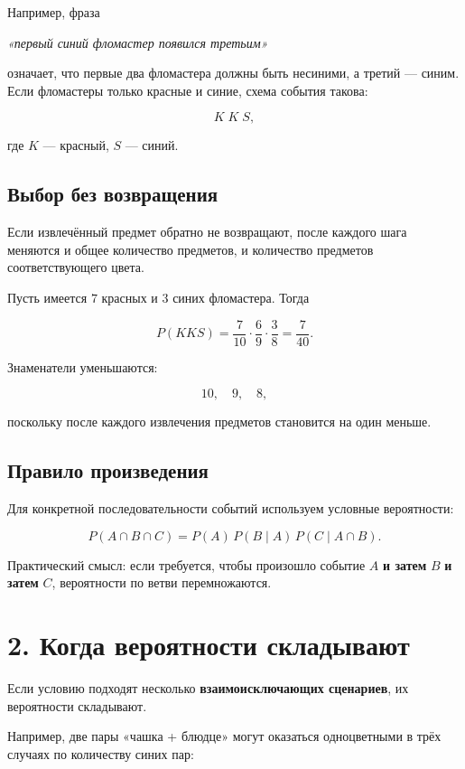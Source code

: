 \documentclass[a4paper,12pt]{article}
\newcommand{\key}[1]{\textcolor{darkaccent}{\textbf{#1}}}
\begin{document}
Например, фраза

\begin{center}
\textit{«первый синий фломастер появился третьим»}
\end{center}

означает, что первые два фломастера должны быть несиними, а третий --- синим. Если фломастеры только красные и синие, схема события такова:

\[
K\;K\;S,
\]

где $K$ --- красный, $S$ --- синий.

\subsection*{Выбор без возвращения}

Если извлечённый предмет обратно не возвращают, после каждого шага меняются и общее количество предметов, и количество предметов соответствующего цвета.

Пусть имеется $7$ красных и $3$ синих фломастера. Тогда

\[
P(KKS)
=
\frac{7}{10}\cdot\frac{6}{9}\cdot\frac{3}{8}
=
\frac{7}{40}.
\]

Знаменатели уменьшаются:

\[
10,\quad 9,\quad 8,
\]

поскольку после каждого извлечения предметов становится на один меньше.

\subsection*{Правило произведения}

Для конкретной последовательности событий используем условные вероятности:

\[
P(A\cap B\cap C)
=
P(A)\,P(B\mid A)\,P(C\mid A\cap B).
\]

Практический смысл: если требуется, чтобы произошло событие $A$ \textbf{и затем} $B$ \textbf{и затем} $C$, вероятности по ветви перемножаются.

\section*{2. Когда вероятности складывают}

Если условию подходят несколько \key{взаимоисключающих сценариев}, их вероятности складывают.

Например, две пары «чашка + блюдце» могут оказаться одноцветными в трёх случаях по количеству синих пар:
\end{document}

